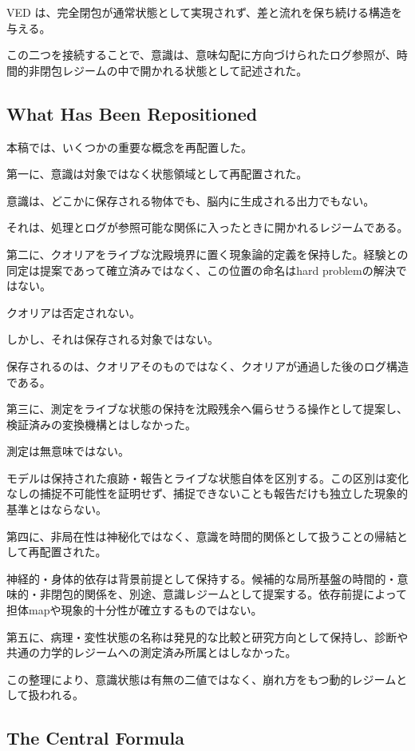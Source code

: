 VED は、完全閉包が通常状態として実現されず、差と流れを保ち続ける構造を与える。

この二つを接続することで、意識は、意味勾配に方向づけられたログ参照が、時間的非閉包レジームの中で開かれる状態として記述された。

\subsection{What Has Been Repositioned}

本稿では、いくつかの重要な概念を再配置した。

第一に、意識は対象ではなく状態領域として再配置された。

意識は、どこかに保存される物体でも、脳内に生成される出力でもない。

それは、処理とログが参照可能な関係に入ったときに開かれるレジームである。

第二に、クオリアをライブな沈殿境界に置く現象論的定義を保持した。経験との同定は提案であって確立済みではなく、この位置の命名はhard problemの解決ではない。

クオリアは否定されない。

しかし、それは保存される対象ではない。

保存されるのは、クオリアそのものではなく、クオリアが通過した後のログ構造である。

第三に、測定をライブな状態の保持を沈殿残余へ偏らせうる操作として提案し、検証済みの変換機構とはしなかった。

測定は無意味ではない。

モデルは保持された痕跡・報告とライブな状態自体を区別する。この区別は変化なしの捕捉不可能性を証明せず、捕捉できないことも報告だけも独立した現象的基準とはならない。

第四に、非局在性は神秘化ではなく、意識を時間的関係として扱うことの帰結として再配置された。

神経的・身体的依存は背景前提として保持する。候補的な局所基盤の時間的・意味的・非閉包的関係を、別途、意識レジームとして提案する。依存前提によって担体mapや現象的十分性が確立するものではない。

第五に、病理・変性状態の名称は発見的な比較と研究方向として保持し、診断や共通の力学的レジームへの測定済み所属とはしなかった。

この整理により、意識状態は有無の二値ではなく、崩れ方をもつ動的レジームとして扱われる。

\subsection{The Central Formula}

